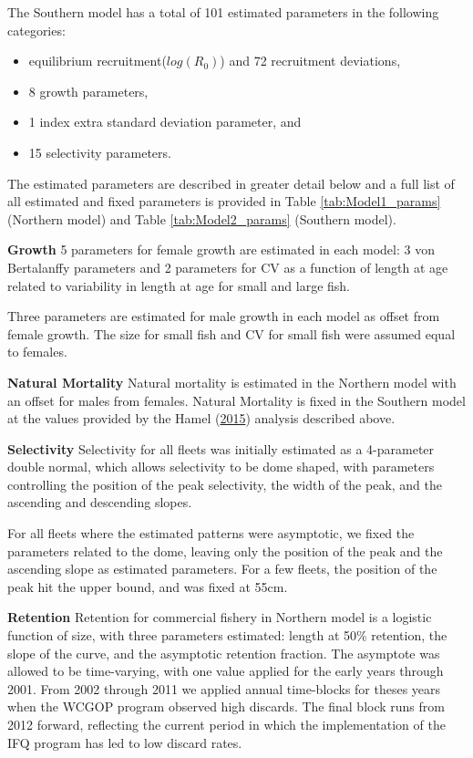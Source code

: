 \documentclass[12pt,]{article}
\providecommand{\tightlist}{%
  \setlength{\itemsep}{0pt}\setlength{\parskip}{0pt}}
\begin{document}
The Southern model has a total of 101 estimated parameters in the
following categories:

\begin{itemize}
\tightlist
\item
  equilibrium recruitment(\(log(R_0)\)) and 72 recruitment deviations,
\item
  8 growth parameters,
\item
  1 index extra standard deviation parameter, and
\item
  15 selectivity parameters.
\end{itemize}

The estimated parameters are described in greater detail below and a
full list of all estimated and fixed parameters is provided in Table
\ref{tab:Model1_params} (Northern model) and Table
\ref{tab:Model2_params} (Southern model).

\textbf{Growth} 5 parameters for female growth are estimated in each
model: 3 von Bertalanffy parameters and 2 parameters for CV as a
function of length at age related to variability in length at age for
small and large fish.

Three parameters are estimated for male growth in each model as offset
from female growth. The size for small fish and CV for small fish were
assumed equal to females.

\textbf{Natural Mortality} Natural mortality is estimated in the
Northern model with an offset for males from females. Natural Mortality
is fixed in the Southern model at the values provided by the Hamel
(\protect\hyperlink{ref-Hamel2015}{2015}) analysis described above.

\textbf{Selectivity} Selectivity for all fleets was initially estimated
as a 4-parameter double normal, which allows selectivity to be dome
shaped, with parameters controlling the position of the peak
selectivity, the width of the peak, and the ascending and descending
slopes.

For all fleets where the estimated patterns were asymptotic, we fixed
the parameters related to the dome, leaving only the position of the
peak and the ascending slope as estimated parameters. For a few fleets,
the position of the peak hit the upper bound, and was fixed at 55cm.

\textbf{Retention} Retention for commercial fishery in Northern model is
a logistic function of size, with three parameters estimated: length at
50\% retention, the slope of the curve, and the asymptotic retention
fraction. The asymptote was allowed to be time-varying, with one value
applied for the early years through 2001. From 2002 through 2011 we
applied annual time-blocks for theses years when the WCGOP program
observed high discards. The final block runs from 2012 forward,
reflecting the current period in which the implementation of the IFQ
program has led to low discard rates.
\end{document}
